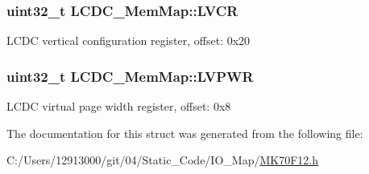 \subsubsection[{L\+V\+C\+R}]{\setlength{\rightskip}{0pt plus 5cm}uint32\+\_\+t L\+C\+D\+C\+\_\+\+Mem\+Map\+::\+L\+V\+C\+R}\label{struct_l_c_d_c___mem_map_a865c74a990435ca94ba226f23894d8e7}
L\+C\+D\+C vertical configuration register, offset\+: 0x20 \hypertarget{struct_l_c_d_c___mem_map_aa687c8b47cdcef18890cac689de49a17}{}
\subsubsection[{L\+V\+P\+W\+R}]{\setlength{\rightskip}{0pt plus 5cm}uint32\+\_\+t L\+C\+D\+C\+\_\+\+Mem\+Map\+::\+L\+V\+P\+W\+R}\label{struct_l_c_d_c___mem_map_aa687c8b47cdcef18890cac689de49a17}
L\+C\+D\+C virtual page width register, offset\+: 0x8 

The documentation for this struct was generated from the following file\+:\begin{DoxyCompactItemize}
\item 
C\+:/\+Users/12913000/git/04/\+Static\+\_\+\+Code/\+I\+O\+\_\+\+Map/\hyperlink{_m_k70_f12_8h}{M\+K70\+F12.\+h}\end{DoxyCompactItemize}
